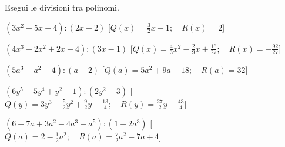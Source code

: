 \begin{esercizio}
\begin{enumeratea}
 \end{enumeratea}
\end{esercizio}


\begin{esercizio}[\Ast]
\label{ese:div.003}
Esegui le divisioni tra polinomi.
 \begin{enumeratea}
 \item $\left(3x^{2}-5x+4\right):\left(2x-2\right)$
  \hfill[$Q(x)=\frac{3}{2}x-1; \quad R(x)=2$]
 \item $\left(4x^{3}-2x^{2}+2x-4\right):\left(3x-1\right)$
  \hfill[$Q(x)=\frac{4}{3}x^{2}-\frac{2}{9}x+\frac{16}{27}; 
         \quad R(x)=-{\frac{92}{27}}$]
 \item $\left(5a^{3}-a^{2}-4\right) : \left(a-2\right)$
  \hfill[$Q(a)=5a^{2}+9a+18; \quad R(a)=32$]
 \item $\left(6y^{5}-5y^{4}+y^{2}-1\right):\left(2y^{2}-3\right)$
  \hfill[$Q(y)=3y^{3}-\frac{5}{2}y^{2}+\frac{9}{2}y-\frac{13}{4}; 
         \quad R(y)=\frac{27}{2}y-\frac{43}{4}$]
 \item $\left(6-7a+3a^{2}-4a^{3}+a^{5}\right):\left(1-2a^{3}\right)$
  \hfill[$Q(a)=2-\frac{1}{2}a^{2}; \quad R(a)=\frac{7}{2}a^{2}-7a+4$]

\end{enumeratea}
\end{esercizio}
